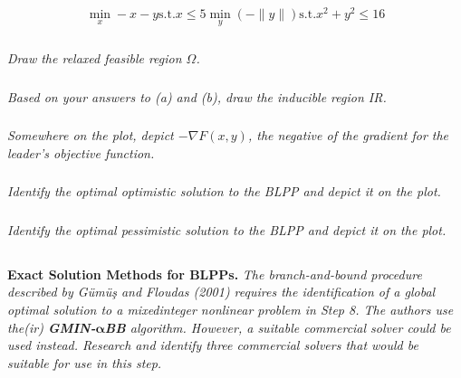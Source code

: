 \documentclass[12pt]{amsart}
\begin{document}
\begin{align*}
	\min_x	-x-y
	\text{s.t.}	x \leq 5
	\min_y	(-\|y\|)
	\text{s.t.}	x^2 + y^2 \leq 16
\end{align*}

% 
% 

\subsubsection{}
\textit{Draw the relaxed feasible region $\Omega$.}

\subsubsection{}
\textit{Based on your answers to (a) and (b), draw the inducible region IR.}

\subsubsection{}
\textit{Somewhere on the plot, depict $-\nabla F(x,y)$, the negative of the gradient for the leader’s objective function.}

\subsubsection{}
\textit{Identify the optimal optimistic solution to the BLPP and depict it on the plot.}

\subsubsection{}
\textit{Identify the optimal pessimistic solution to the BLPP and depict it on the plot.}



\subsection{}
\textbf{Exact Solution Methods for BLPPs.} 
\textit{The branch-and-bound procedure described by Gümüş and Floudas (2001) requires the identification of a global optimal solution to a mixedinteger nonlinear problem in Step 8. The authors use the(ir) \textbf{GMIN-}$\mathbf\alpha$\textbf{BB} algorithm. However, a suitable commercial solver could be used instead. Research and identify three commercial solvers that would be suitable for use in this step.} \\
\end{document}
